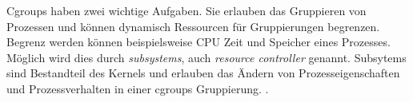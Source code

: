 Cgroups haben zwei wichtige Aufgaben. Sie erlauben das Gruppieren
von Prozessen und können dynamisch Ressourcen für Gruppierungen begrenzen.
Begrenz werden können beispielsweise CPU Zeit und Speicher eines Prozesses.
Möglich wird dies durch \emph{subsystems},
auch \emph{resource controller} genannt. Subsytems sind Bestandteil
des Kernels und erlauben das Ändern von Prozesseigenschaften und
Prozessverhalten in einer cgroups Gruppierung. 
\cite{RedHatIntroToLinuxContainers}.








